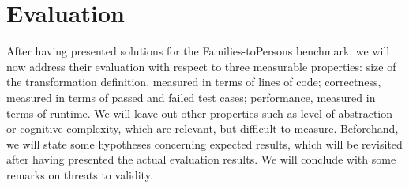\section{Evaluation}
\label{sec:Evaluation}


After having presented solutions for the Families-to\-Persons benchmark, we will now address their evaluation with respect to three measurable properties: size of the transformation definition, measured in terms of lines of code; correctness, measured in terms of passed and failed test cases; performance, measured in terms of runtime. We will leave out other properties such as level of abstraction or cognitive complexity, which are relevant, but difficult to measure. Beforehand, we will state some hypotheses concerning expected results, which will be revisited after having presented the actual evaluation results. We will conclude with some remarks on threats to validity.














